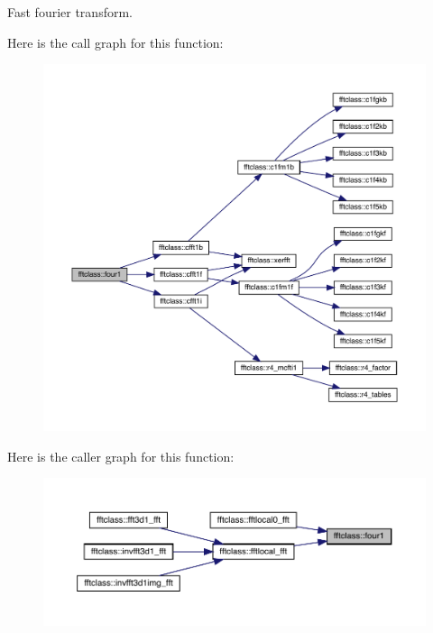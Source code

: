 Fast fourier transform. 

Here is the call graph for this function\+:\nopagebreak
\begin{figure}[H]
\begin{center}
\leavevmode
\includegraphics[width=350pt]{namespacefftclass_a4597d420a1363f9fd0b652472d7caf52_cgraph}
\end{center}
\end{figure}
Here is the caller graph for this function\+:\nopagebreak
\begin{figure}[H]
\begin{center}
\leavevmode
\includegraphics[width=350pt]{namespacefftclass_a4597d420a1363f9fd0b652472d7caf52_icgraph}
\end{center}
\end{figure}
\mbox{\label{namespacefftclass_a21e8a7bd2877ec439bc4f0e0bc0e4681}} 
